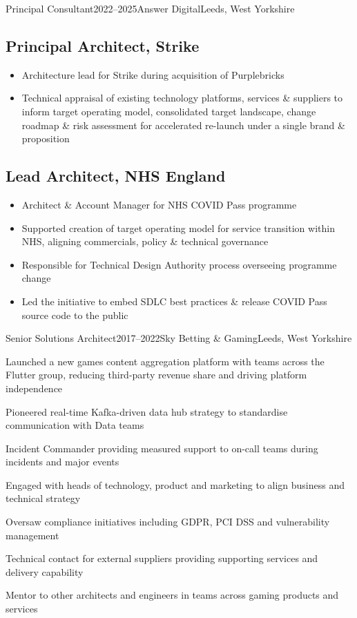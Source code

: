 \documentclass{cv}
\begin{document}
\begin{experienceplain}{Principal Consultant}{2022--2025}{Answer Digital}{Leeds, West Yorkshire}
\subsection{Principal Architect, Strike}
\begin{itemize}
\item Architecture lead for Strike during acquisition of Purplebricks
\item Technical appraisal of existing technology platforms, services \& suppliers to inform target
      operating model, consolidated target landscape, change roadmap \& risk assessment for
      accelerated re-launch under a single brand \& proposition\end{itemize}

\subsection{Lead Architect, NHS England}
\begin{itemize}
\item Architect \& Account Manager for NHS COVID Pass programme
\item Supported creation of target operating model for service transition within NHS, aligning
      commercials, policy \& technical governance
\item Responsible for Technical Design Authority process overseeing programme change
\item Led the initiative to embed SDLC best practices \& release COVID Pass source code to
      the public
\end{itemize}
\end{experienceplain}


\begin{experience}{Senior Solutions Architect}{2017--2022}{Sky Betting \& Gaming}{Leeds, West Yorkshire}
\item Launched a new games content aggregation platform with teams across the Flutter group, reducing
      third-party revenue share and driving platform independence
\item Pioneered real-time Kafka-driven data hub strategy to standardise communication with Data teams
\item Incident Commander providing measured support to on-call teams during incidents and major events
\item Engaged with heads of technology, product and marketing to align business and technical strategy
\item Oversaw compliance initiatives including GDPR, PCI DSS and vulnerability management
\item Technical contact for external suppliers providing supporting services and delivery capability
\item Mentor to other architects and engineers in teams across gaming products and services
\end{experience}
\end{document}

